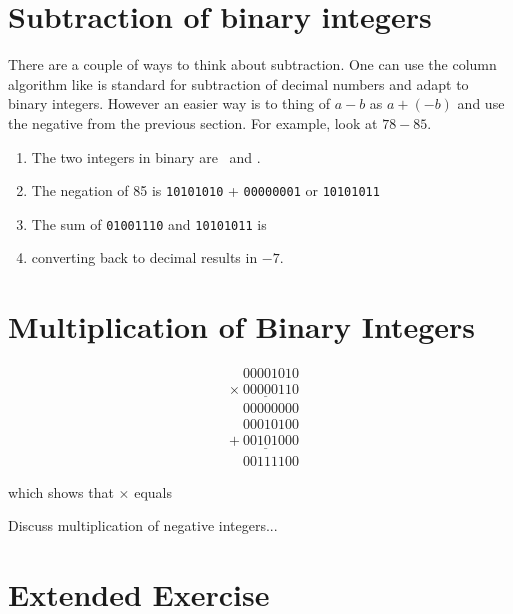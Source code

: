 \section{Subtraction of binary integers}

There are a couple of ways to think about subtraction.  One can use the column algorithm like is standard for subtraction of decimal numbers and adapt to binary integers.  However an easier way is to thing of $a-b$ as $a+(-b)$ and use the negative from the previous section.  For example, look at $78-85$.  

\begin{enumerate}
\item The two integers in binary are  \printpythontex[verb] ~and  \printpythontex[verb].
\item The negation of 85 is \verb!10101010! + \verb!00000001! or \verb!10101011!
\item The sum of \verb!01001110! and \verb!10101011! is  \printpythontex[verb]
\item converting back to decimal results in $-7$.  
\end{enumerate}

\section{Multiplication of Binary Integers}


\begin{align*}
&\phantom{\times~}00001010 \\
&\underline{\times\phantom{~}00000110~} \\
&\phantom{\times~}00000000 \\
&\phantom{\times~}00010100 \\
&\underline{+\phantom{~}00101000~} \\
&\phantom{\times~}00111100
\end{align*}

which shows that  \printpythontex[verb] $\times$ 
 \printpythontex[verb] equals
 \printpythontex[verb]


{\color{red} Discuss multiplication of negative integers...}

\section{Extended Exercise}

